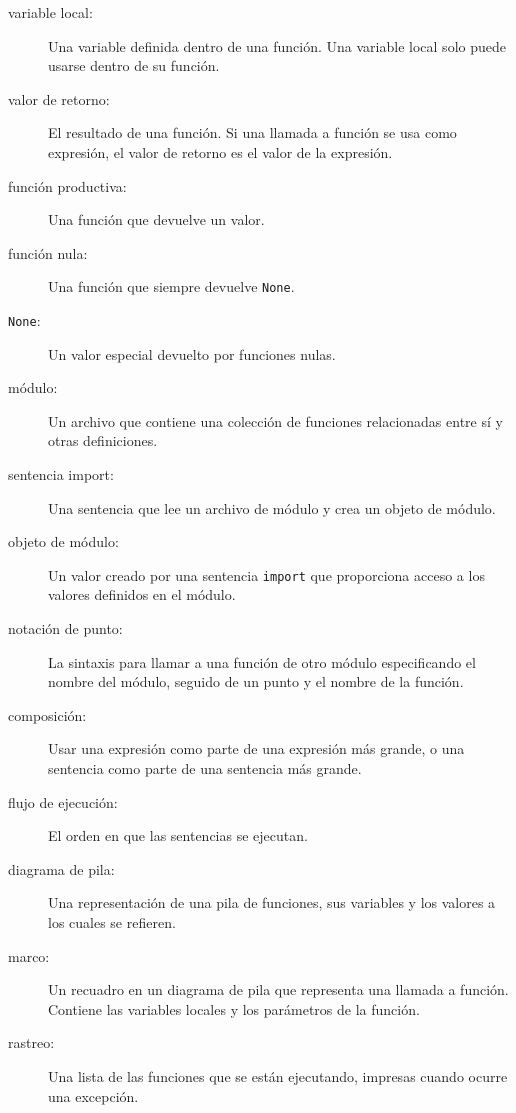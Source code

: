 \documentclass[10pt]{book}
\begin{document}
\begin{description}
\item[variable local:]  Una variable definida dentro de una función. Una variable
local solo puede usarse dentro de su función.

\item[valor de retorno:]  El resultado de una función.  Si una llamada a función
se usa como expresión, el valor de retorno es el valor de
la expresión.

\item[función productiva:] Una función que devuelve un valor.

\item[función nula:] Una función que siempre devuelve {\tt None}.

\item[{\tt None}:]  Un valor especial devuelto por funciones nulas.

\item[módulo:] Un archivo que contiene una
colección de funciones relacionadas entre sí y otras definiciones.

\item[sentencia import:] Una sentencia que lee un archivo de módulo y crea
un objeto de módulo.

\item[objeto de módulo:] Un valor creado por una sentencia {\tt import}
que proporciona acceso a los valores definidos en el módulo.

\item[notación de punto:]  La sintaxis para llamar a una función de otro
módulo especificando el nombre del módulo, seguido de un punto y
el nombre de la función.

\item[composición:] Usar una expresión como parte de una expresión más grande,
o una sentencia como parte de una sentencia más grande.

\item[flujo de ejecución:]  El orden en que las sentencias se ejecutan.

\item[diagrama de pila:]  Una representación de una pila de funciones,
sus variables y los valores a los cuales se refieren.

\item[marco:]  Un recuadro en un diagrama de pila que representa una llamada a función.
Contiene las variables locales y los parámetros de la función.

\item[rastreo:]  Una lista de las funciones que se están ejecutando,
impresas cuando ocurre una excepción.


\end{description}
\end{document}
